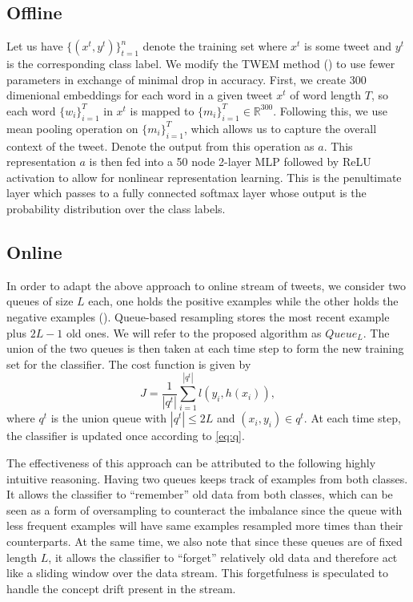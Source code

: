 \documentclass{article}
\begin{document}
  \subsection{Offline}
  Let us have \(\{(x^t, y^t)\}_{t=1}^n\) denote the training set where
  \(x^t\) is some tweet and \(y^t\) is the corresponding class label.
  We modify the TWEM method (\citet{kshirsagar2018predictive}) to use fewer parameters
  in exchange of minimal drop in accuracy. First, we create 300 dimenional embeddings for
  each word in a given tweet \(x^t\) of word length \(T\), so each word \(\{w_i\}_{i=1}^T\) in \(x^t\) is mapped to \(\{m_i\}_{i=1}^{T}\in \mathbb{R}^{300}\).
  Following this, we use mean pooling operation on \(\{m_i\}_{i=1}^T\), which allows us to capture the overall
  context of the tweet. Denote the output from this operation as \(a\). This representation \(a\) is then fed
  into a 50 node 2-layer MLP followed by ReLU activation to allow for nonlinear representation learning.
  This is the penultimate layer which passes to a fully connected softmax layer whose output is the probability
  distribution over the class labels.
  \subsection{Online}
  In order to adapt the above approach to online stream of tweets, we consider two queues of size \(L\)
  each, one holds the positive examples while the other holds the negative examples (\cite{Malialis2018QueueBasedRF}). Queue-based resampling stores the most recent example plus
  \(2L-1\) old ones. We will refer to the proposed algorithm as \(Queue_L\). The union of the two queues is then taken at each
  time step to form the new training set for the classifier. The cost function is given by
  \begin{equation} \label{eq:q}
      J=\frac{1}{|q^t|}\sum_{i=1}^{|q^t|} l(y_i, h(x_i)),
  \end{equation}
  where \(q^t\) is the union queue with \(|q^t|\leq 2L\) and \((x_i, y_i)\in q^t\). At each time step, the
  classifier is updated once according to \ref{eq:q}.

  The effectiveness of this approach can be attributed to the following highly intuitive reasoning. Having two queues keeps track of
  examples from both classes. It allows the classifier to ``remember'' old data from both classes, which can be seen as a form of oversampling to counteract the imbalance since the
  queue with less frequent examples will have same examples resampled more times than their counterparts. At the same time, we also note that since these queues are of
  fixed length \(L\), it allows the classifier to ``forget'' relatively old data and therefore act like a sliding window over the data stream. This forgetfulness is speculated to
  handle the concept drift present in the stream.
\end{document}
